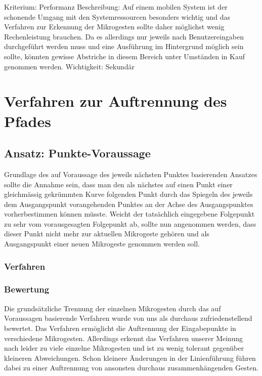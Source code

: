Kriterium:	Performanz
Beschreibung:	Auf einem mobilen System ist der schonende Umgang mit den Systemressourcen besonders wichtig und das Verfahren zur Erkennung der Mikrogesten sollte daher möglichst wenig Rechenleistung brauchen. Da es allerdings nur jeweils nach Benutzereingaben durchgeführt werden muss und eine Ausführung im Hintergrund möglich sein sollte, könnten gewisse Abstriche in diesem Bereich unter Umständen in Kauf genommen werden.
Wichtigkeit:	Sekundär
\section{Verfahren zur Auftrennung des Pfades}
\subsection{Ansatz: Punkte-Voraussage}

Grundlage des auf Voraussage des jeweils nächsten Punktes basierenden Ansatzes sollte die Annahme sein, dass man den als nächstes auf einen Punkt einer gleichmässig gekrümmten Kurve folgenden Punkt durch das Spiegeln des jeweils dem Ausgangspunkt vorangehenden Punktes an der Achse des Ausgangspunktes vorherbestimmen können müsste. Weicht der tatsächlich eingegebene Folgepunkt zu sehr vom vorausgesagten Folgepunkt ab, sollte nun angenommen werden, dass dieser Punkt nicht mehr zur aktuellen Mikrogeste gehören und als Ausgangspunkt einer neuen Mikrogeste genommen werden soll.

\subsubsection{Verfahren}


\subsubsection{Bewertung}

Die grundsätzliche Trennung der einzelnen Mikrogesten durch das auf Voraussagen basierende Verfahren wurde von uns als durchaus zufriedenstellend bewertet. Das Verfahren ermöglicht die Auftrennung der Eingabepunkte in verschiedene Mikrogesten. Allerdings erkennt das Verfahren unserer Meinung nach leider zu viele einzelne Mikrogesten und ist zu wenig tolerant gegenüber kleineren Abweichungen. Schon kleinere Änderungen in der Linienführung führen dabei zu einer Auftrennung von ansonsten durchaus zusammenhängenden Gesten.

